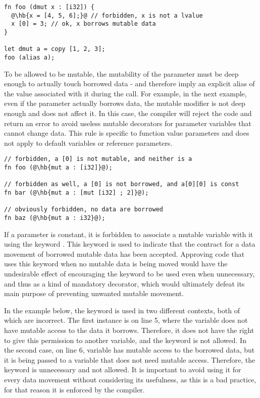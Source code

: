 \begin{lstlisting}[style=coloredverbatim, escapechar=@]
fn foo (dmut x : [i32]) {
  @\hb{x = [4, 5, 6];}@ // forbidden, x is not a lvalue
  x [0] = 3; // ok, x borrows mutable data
}

let dmut a = copy [1, 2, 3];
foo (alias a);
\end{lstlisting}

To be allowed to be mutable, the mutability of the parameter must be deep enough
to actually touch borrowed data - and therefore imply an explicit alias of the
value associated with it during the call. For example, in the next example, even
if the parameter actually borrows data, the mutable modifier is not deep enough
and does not affect it. In this case, the compiler will reject the code and
return an error to avoid useless mutable decorators for parameter variables that
cannot change data. This rule is specific to function value parameters and does
not apply to default variables or reference parameters.

\begin{lstlisting}[style=coloredverbatim, escapechar=@]
// forbidden, a [0] is not mutable, and neither is a
fn foo (@\hb{mut a : [i32]}@);

// forbidden as well, a [0] is not borrowed, and a[0][0] is const
fn bar (@\hb{mut a : [mut [i32] ; 2]}@);

// obviously forbidden, no data are borrowed
fn baz (@\hb{mut a : i32}@);
\end{lstlisting}

If a parameter is constant, it is forbidden to associate a mutable variable with
it using the keyword . This keyword is used to indicate that the
contract for a data movement of borrowed mutable data has been accepted.
Approving code that uses this keyword when no mutable data is being moved would
have the undesirable effect of encouraging the keyword to be used even when
unnecessary, and thus as a kind of mandatory decorator, which would ultimately
defeat its main purpose of preventing unwanted mutable movement.

In the example below, the keyword  is used in two different
contexts, both of which are incorrect. The first instance is on line 5, where
the variable  does not have mutable access to the data it borrows.
Therefore, it does not have the right to give this permission to another
variable, and the keyword  is not allowed. In the second case, on
line 6, variable  has mutable access to the borrowed data, but it is
being passed to a variable that does not need mutable access. Therefore, the
keyword is unnecessary and not allowed. It is important to avoid using it for
every data movement without considering its usefulness, as this is a bad
practice, for that reason it is enforced by the compiler.

